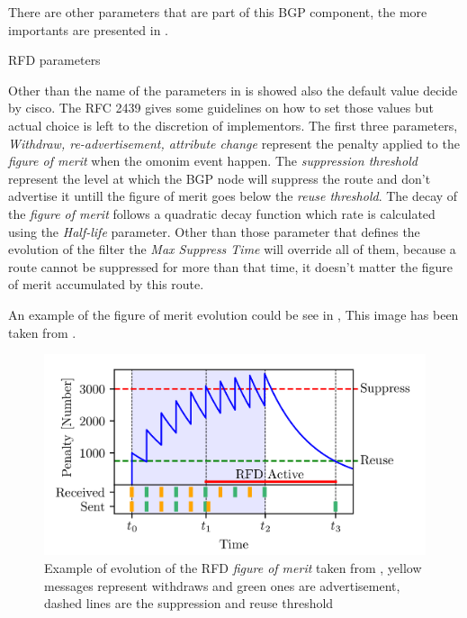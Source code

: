 There are other parameters that are part of this \ac{BGP} component, the more 
importants are presented in .

\begin{table}[ht]
	
	\caption{\ac{RFD} parameters}
	\label{tbl:rfd_defaults}
\end{table}

Other than the name of the parameters in  is showed also
the default value decide by cisco.
The \ac{RFC} \num{2439} \cite{rfc2439} gives some guidelines on how to set those
values but actual choice is left to the discretion of implementors.
The first three parameters, \textit{Withdraw, re-advertisement, attribute change}
represent the penalty applied to the \textit{figure of merit} when the omonim event
happen.
The \textit{suppression threshold} represent the level at which the \ac{BGP} node will
suppress the route and don't advertise it untill the figure of merit goes
below the \textit{reuse threshold}.
The decay of the \textit{figure of merit} follows a quadratic decay function
which rate is calculated using the \textit{Half-life} parameter.
Other than those parameter that defines the evolution of the filter the
\textit{Max Suppress Time} will override all of them, because a route cannot
be suppressed for more than that time, it doesn't matter the figure of merit
accumulated by this route.

An example of the figure of merit evolution could be see in ,
This image has been taken from \cite{gray2020bgp}.

\begin{figure}[ht]
    \centering
    \includegraphics[scale=0.22]{images/RFD/evolution.png}
	\caption{Example of evolution of the \ac{RFD} \textit{figure of merit} taken 
	from \cite{gray2020bgp}, yellow messages represent withdraws and green ones
	are advertisement, dashed lines are the suppression and reuse threshold}
    \label{fig:figure_of_merit}
\end{figure}


